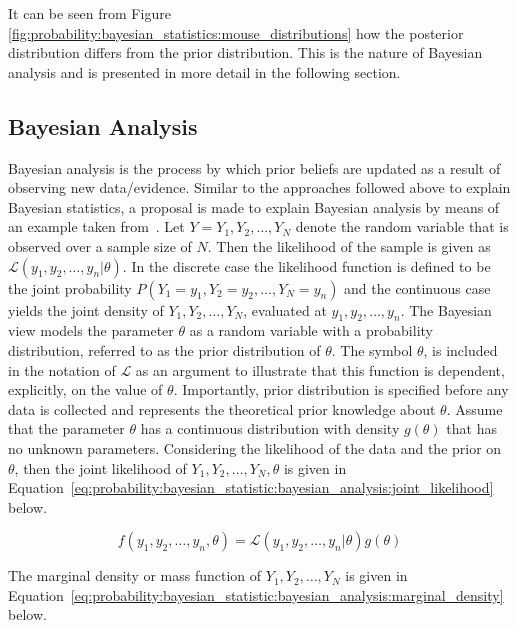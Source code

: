 It can be seen from Figure \ref{fig:probability:bayesian_statistics:mouse_distributions} how the posterior distribution differs from the prior distribution. This is the nature of Bayesian analysis and is presented in more detail in the following section.

\subsection{Bayesian Analysis}
\label{sec:probability:bayesian_statistics:bayesian_analysis}

Bayesian analysis is the process by which prior beliefs are updated as a result of observing new data/evidence. Similar to the approaches followed above to explain Bayesian statistics, a proposal is made to explain Bayesian analysis by means of an example taken from~\cite{ref:wackerly:2014}. Let $Y = Y_{1}, Y_{2}, \dots, Y_{N}$ denote the random variable that is observed over a sample size of $N$. Then the likelihood of the sample is given as $\mathcal{L}(y_{1}, y_{2}, \dots, y_{n} \vert \theta)$. In the discrete case the likelihood function is defined to be the joint probability $P(Y_{1} = y_{1}, Y_{2} = y_{2}, \dots, Y_{N} = y_{n})$ and the continuous case yields the joint density of $Y_{1}, Y_{2}, \dots, Y_{N}$, evaluated at $y_{1}, y_{2}, \dots, y_{n}$. The Bayesian view models the parameter $\theta$ as a random variable with a probability distribution, referred to as the prior distribution of $\theta$. The symbol $\theta$, is included in the notation of $\mathcal{L}$ as an argument to illustrate that this function is dependent, explicitly, on the value of $\theta$. Importantly, prior distribution is specified before any data is collected and represents the theoretical prior knowledge about $\theta$. Assume that the parameter $\theta$ has a continuous distribution with density $g(\theta)$ that has no unknown parameters. Considering the likelihood of the data and the prior on $\theta$, then the joint likelihood of $Y_{1}, Y_{2}, \dots, Y_{N}, \theta$ is given in Equation~\eqref{eq:probability:bayesian_statistic:bayesian_analysis:joint_likelihood} below.

\begin{equation}
      \label{eq:probability:bayesian_statistic:bayesian_analysis:joint_likelihood}
      f(y_{1}, y_{2}, \dots, y_{n}, \theta) = \mathcal{L}(y_{1}, y_{2}, \dots, y_{n} \vert \theta)g(\theta)
\end{equation}

The marginal density or mass function of $Y_{1}, Y_{2}, \dots, Y_{N}$ is given in Equation~\eqref{eq:probability:bayesian_statistic:bayesian_analysis:marginal_density} below.

